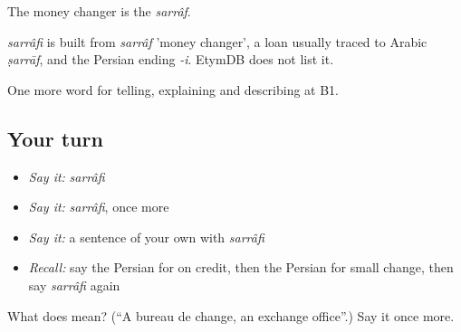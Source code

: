 The money changer is the \emph{sarrâf}.

\begin{cousinweb}
\emph{sarrâfi} is built from \emph{sarrâf} 'money changer', a loan usually traced to Arabic \emph{ṣarrāf}, and the Persian ending \emph{-i}. EtymDB does not list it.
\end{cousinweb}

\begin{grammarlens}[title={What you've built}]
One more word for telling, explaining and describing at B1.
\end{grammarlens}

\subsection*{Your turn}
\begin{itemize}
\raggedright
  \item \emph{Say it:} \emph{sarrâfi}
  \item \emph{Say it:} \emph{sarrâfi}, once more
  \item \emph{Say it:} a sentence of your own with \emph{sarrâfi}
  \item \emph{Recall:} say the Persian for on credit, then the Persian for small change, then say \emph{sarrâfi} again
\end{itemize}

\begin{tcolorbox}[breakable,colback=teal!4,colframe=teal!35!black,title={Before you move on}]
What does  mean? (\textquotedblleft{}A bureau de change, an exchange office\textquotedblright{}.) Say it once more.
\end{tcolorbox}
